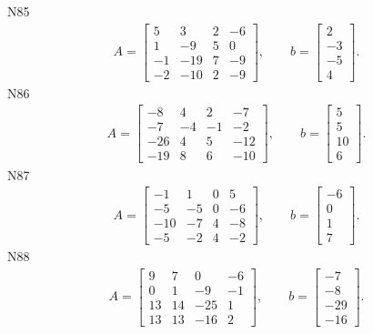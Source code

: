 \documentclass[11pt]{report}
\begin{document}
N85
\begin{align*}
 A = \left[\begin{matrix}5 & 3 & 2 & -6\\1 & -9 & 5 & 0\\-1 & -19 & 7 & -9\\-2 & -10 & 2 & -9\end{matrix}\right],
\qquad b = \left[\begin{matrix}2\\-3\\-5\\4\end{matrix}\right]. 
 \end{align*}
N86
\begin{align*}
 A = \left[\begin{matrix}-8 & 4 & 2 & -7\\-7 & -4 & -1 & -2\\-26 & 4 & 5 & -12\\-19 & 8 & 6 & -10\end{matrix}\right],
\qquad b = \left[\begin{matrix}5\\5\\10\\6\end{matrix}\right]. 
 \end{align*}
N87
\begin{align*}
 A = \left[\begin{matrix}-1 & 1 & 0 & 5\\-5 & -5 & 0 & -6\\-10 & -7 & 4 & -8\\-5 & -2 & 4 & -2\end{matrix}\right],
\qquad b = \left[\begin{matrix}-6\\0\\1\\7\end{matrix}\right]. 
 \end{align*}
N88
\begin{align*}
 A = \left[\begin{matrix}9 & 7 & 0 & -6\\0 & 1 & -9 & -1\\13 & 14 & -25 & 1\\13 & 13 & -16 & 2\end{matrix}\right],
\qquad b = \left[\begin{matrix}-7\\-8\\-29\\-16\end{matrix}\right]. 
 \end{align*}
\end{document}
